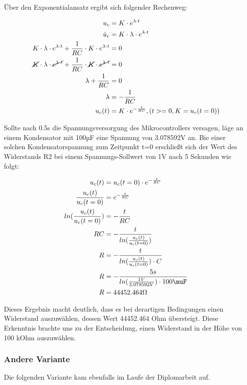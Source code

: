 Über den Exponentialansatz ergibt sich folgender Rechenweg:

\begin{align*}
    u_c &= K \cdot e^{\lambda \cdot t} \\
    \dot{u}_c &= K \cdot \lambda \cdot e^{\lambda \cdot t} \\
    K \cdot \lambda \cdot e^{\lambda \cdot t} + \frac{1}{RC} \cdot K \cdot e^{\lambda \cdot t} &= 0 \\
    \cancel{K} \cdot \lambda \cdot \cancel{e^{\lambda \cdot t}} + \frac{1}{RC} \cdot \cancel{K} \cdot \cancel{e^{\lambda \cdot t}} &= 0 \\
    \lambda + \frac{1}{RC} &= 0 \\
    \lambda &= -\frac{1}{RC} \\
    u_c(t) &= K \cdot e^{-\frac{t}{RC}}, (t >= 0, K = u_c(t=0)) \\
\end{align*}

Sollte nach 0.5s die Spannungsversorgung des Mikrocontrollers versagen, läge an einem Kondensator mit 100µF eine Spannung von 3.078592V an.
Bie einer solchen Kondensatorspannung zum Zeitpunkt t=0 erschließt sich der
Wert des Widerstands R2 bei einem Spannungs-Sollwert von 1V nach 5 Sekunden wie folgt:

\begin{align*}
    u_c(t) &= u_c(t=0) \cdot e^{-\frac{t}{RC}} \\
    \frac{u_c(t)}{u_c(t=0)} &= e^{-\frac{t}{RC}} \\
    ln(\frac{u_c(t)}{u_c(t=0)}) &= -\frac{t}{RC} \\
    RC &= -\frac{t}{ln(\frac{u_c(t)}{u_c(t=0)})} \\
    R &= -\frac{t}{ln(\frac{u_c(t)}{u_c(t=0)}) \cdot C} \\
    R &= -\frac{5s}{ln(\frac{1V}{3.078592V}) \cdot 100\muF} \\
    R &=  44452.464\Omega
\end{align*}

Dieses Ergebnis macht deutlich, dass es bei derartigen Bedingungen einen Widerstand auszuwählen, dessen Wert 44452.464 Ohm übersteigt.
Diese Erkenntnis brachte uns zu der Entscheidung, einen Widerstand in der Höhe von 100 kOhm auszuwählen.

\newpage

\subsubsection{Andere Variante }
Die folgenden Variante kam ebenfalls im Laufe der Diplomarbeit auf.

